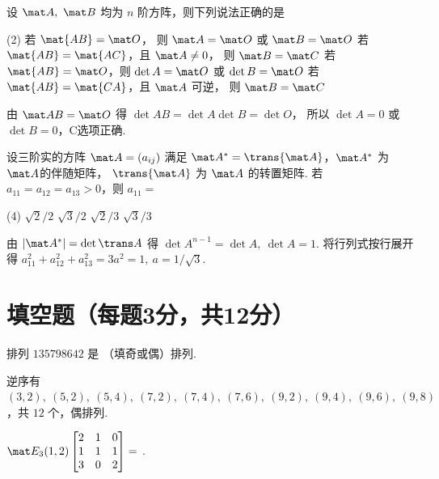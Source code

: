 \begin{problem}
  设 $\mat A,~ \mat B$ 均为 $n$ 阶方阵，则下列说法正确的是
  \begin{tasks}(2)
    \task 若 $\mat{AB} = \mat O$，
    则 $\mat A = \mat O$ 或 $\mat B = \mat O$
    \task 若 $\mat{AB} = \mat{AC}$，且 $\mat A \neq 0$，
    则 $\mat B = \mat C$
    \task[\true] 若 $\mat{AB} = \mat O$，则 $\det A = \mat O$
    或 $\det B = \mat O$
    \task 若 $\mat{AB} = \mat{CA}$，且 $\mat A$ 可逆，
    则 $\mat B = \mat C$
  \end{tasks}
\end{problem}
\scratch
\begin{solution}
  由 $\mat AB = \mat O$ 得 $\det{AB} = \det A \det B = \det O$，
  所以 $\det A = 0$ 或 $\det B = 0$，C选项正确.
\end{solution}

\begin{problem}
  设三阶实的方阵 $\mat A = (a_{ij})$ 满足
  $\mat A^* = \trans{\mat A}$，$\mat A^*$ 为 $\mat A$的伴随矩阵，
  $\trans{\mat A}$ 为 $\mat A$ 的转置矩阵.
  若 $a_{11} = a_{12} = a_{13} > 0$，则 $a_{11} = $
  \begin{tasks}(4)
    \task $\sqrt2/2$
    \task $\sqrt3/2$
    \task $\sqrt2/3$
    \task[\true] $\sqrt3/3$
  \end{tasks}
\end{problem}
\scratch
\begin{solution}
  由 $|\mat A^*| = \det{\trans A}$ 得
  $\det A^{n-1} = \det A,~ \det A = 1$.
  将行列式按行展开得 $a_{11}^2 + a_{12}^2 + a_{13}^2 = 3a^2 = 1,~ a = 1/\sqrt3$.
\end{solution}

\section{填空题（每题3分，共12分）}

\begin{problem}
  排列 $135798642$ 是  （填奇或偶）排列.
\end{problem}
\begin{solution}
  逆序有 $(3,2),~ (5,2),~ (5,4),~ (7,2),~ (7,4),~ (7,6),~(9,2),~ (9,4),~
  (9,6),~ (9,8)$，共 $12$ 个，偶排列.
\end{solution}

\begin{problem}
  $ \mat E_3(1,2)
    \begin{bmatrix}
      2 & 1 & 0\\
      1 & 1 & 1\\
      3 & 0 & 2
    \end{bmatrix} = $
  \result
    {
    }.
\end{problem}

